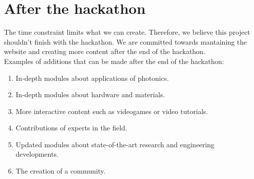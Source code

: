 \documentclass[hidelinks, a4paper,12pt]{article}
\begin{document}
\section{After the hackathon}
The time constraint limits what we can create. Therefore, we believe this project shouldn't finish with the hackathon. We are committed towards mantaining the website and creating more content after the end of the hackathon. \\
Examples of additions that can be made after the end of the hackathon:
\begin{enumerate}
  \item In-depth modules about applications of photonics.
  \item In-depth modules about hardware and materials.
  \item More interactive content such as videogames or video tutorials.
  \item Contributions of experts in the field.
  \item Updated modules about state-of-the-art research and engineering developments.
  \item The creation of a community.
\end{enumerate}
\end{document}
